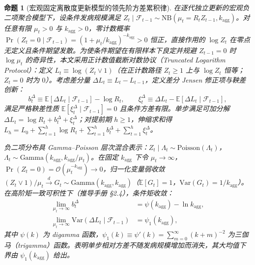 \documentclass[11pt,a4paper]{article}
\theoremstyle{plain}
\newtheorem{proposition}{命题}
\theoremstyle{definition}
\begin{document}
\begin{proposition}[宏观固定离散度更新模型的领先阶方差累积律]\label{thm:t5}
在逐代独立更新的宏观负二项聚合模型下，设条件发病规模满足 $Z_t \mid \mathcal{F}_{t-1} \sim \text{NB}(\mu_t = R_t Z_{t-1}, k_{\text{agg}})$。对任意有限 $\mu_t > 0$ 与 $k_{\text{agg}} > 0$，零计数概率 $\Pr(Z_t = 0 \mid \mathcal{F}_{t-1}) = (1 + \mu_t/k_{\text{agg}})^{-k_{\text{agg}}} > 0$ 恒正，直接作用的 $\log Z_t$ 在零点无定义且条件期望发散。为使条件期望在有限样本下良定并规避 $Z_{t-1}=0$ 时 $\log\mu_t$ 的奇异性，本文采用正计数值截断对数协议（Truncated Logarithm Protocol）：定义 $L_t \equiv \log(Z_t \vee 1)$（在正计数路径 $Z_t \ge 1$ 上与 $\log Z_t$ 恒等；$Z_t = 0$ 时为 $0$）。考虑差分量 $\Delta L_t \equiv L_t - L_{t-1}$，定义差分 Jensen 修正项与鞅差创新：
\begin{equation}
b_t^\Delta \equiv \mathbb{E}[\Delta L_t \mid \mathcal{F}_{t-1}] - \log R_t, \qquad \xi_t^\Delta \equiv \Delta L_t - \mathbb{E}[\Delta L_t \mid \mathcal{F}_{t-1}],
\label{eq:truncated_log_recurrence}
\end{equation}
满足严格鞅差性质 $\mathbb{E}[\xi_t^\Delta \mid \mathcal{F}_{t-1}] = 0$ 且条件方差有限。单步满足可加分解 $\Delta L_t = \log R_t + b_t^\Delta + \xi_t^\Delta$；对提前期 $h \ge 1$，伸缩求和得 $L_h = L_0 + \sum_{t=1}^h \log R_t + \sum_{t=1}^h b_t^\Delta + \sum_{t=1}^h \xi_t^\Delta$。

负二项分布具 Gamma--Poisson 层次混合表示：$Z_t \mid \Lambda_t \sim \text{Poisson}(\Lambda_t)$，$\Lambda_t \sim \text{Gamma}(k_{\text{agg}}, k_{\text{agg}}/\mu_t)$。在固定 $k_{\text{agg}}$ 下令 $\mu_t \to \infty$，$\Pr(Z_t = 0) = \mathcal{O}(\mu_t^{-k_{\text{agg}}}) \to 0$，归一化变量弱收敛 $(Z_t \vee 1)/\mu_t \xrightarrow{d} G_t \sim \text{Gamma}(k_{\text{agg}}, k_{\text{agg}})$（$\mathbb{E}[G_t]=1$，$\text{Var}(G_t)=1/k_{\text{agg}}$）。在高阶矩一致可积性下（推导手册 §2.4），条件矩收敛：
\begin{equation}
\begin{aligned}
\lim_{\mu_t \to \infty} b_t^\Delta &= \psi(k_{\text{agg}}) - \ln k_{\text{agg}}, \\
\lim_{\mu_t \to \infty} \text{Var}(\Delta L_t \mid \mathcal{F}_{t-1}) &= \psi_1(k_{\text{agg}}),
\end{aligned}
\end{equation}
其中 $\psi(k)$ 为 digamma 函数，$\psi_1(k) \equiv \psi'(k) = \sum_{m=0}^\infty (k + m)^{-2}$ 为三伽马（trigamma）函数。表明单步相对方差不随发病规模增加而消失，其大均值下界由 $\psi_1(k_{\text{agg}})$ 给出。


\end{proposition}
\end{document}
